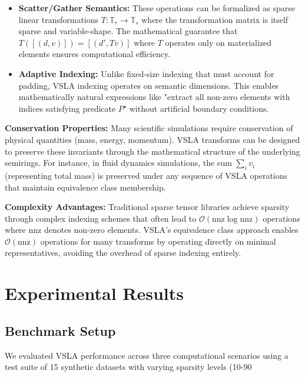 \documentclass[11pt]{article}
\begin{document}
\begin{itemize}
\item \textbf{Scatter/Gather Semantics:} These operations can be formalized as sparse linear transformations $T: \mathbb{T}_r \to \mathbb{T}_s$ where the transformation matrix is itself sparse and variable-shape. The mathematical guarantee that $T([(d,v)]) = [(d', Tv)]$ where $T$ operates only on materialized elements ensures computational efficiency.

\item \textbf{Adaptive Indexing:} Unlike fixed-size indexing that must account for padding, VSLA indexing operates on semantic dimensions. This enables mathematically natural expressions like "extract all non-zero elements with indices satisfying predicate $P$" without artificial boundary conditions.
\end{itemize}

\textbf{Conservation Properties:} Many scientific simulations require conservation of physical quantities (mass, energy, momentum). VSLA transforms can be designed to preserve these invariants through the mathematical structure of the underlying semirings. For instance, in fluid dynamics simulations, the sum $\sum_i v_i$ (representing total mass) is preserved under any sequence of VSLA operations that maintain equivalence class membership.

\textbf{Complexity Advantages:} Traditional sparse tensor libraries achieve sparsity through complex indexing schemes that often lead to $\mathcal{O}(\text{nnz} \log \text{nnz})$ operations where $\text{nnz}$ denotes non-zero elements. VSLA's equivalence class approach enables $\mathcal{O}(\text{nnz})$ operations for many transforms by operating directly on minimal representatives, avoiding the overhead of sparse indexing entirely.

\section{Experimental Results}
\label{sec:evaluation}

\subsection{Benchmark Setup}
We evaluated VSLA performance across three computational scenarios using a test suite of 15 synthetic datasets with varying sparsity levels (10-90%
\end{document}
